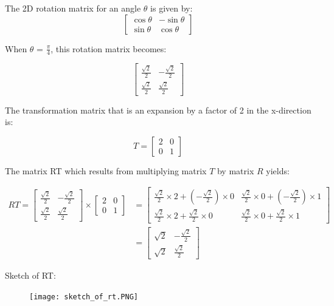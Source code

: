 \documentclass{article}
\begin{document}
The 2D rotation matrix for an angle $\theta$ is given by:
\[
\begin{bmatrix}
\cos \theta & -\sin \theta \\
\sin \theta & \cos \theta
\end{bmatrix}
\]

When $\theta$ = $\frac{\pi}{4}$, this rotation matrix becomes:

\[
\begin{bmatrix}
\frac{\sqrt{2}}{2} & -\frac{\sqrt{2}}{2} \\
\frac{\sqrt{2}}{2} & \frac{\sqrt{2}}{2}
\end{bmatrix}
\] 

The transformation matrix that is an expansion by a factor of 2 in the x-direction is:

\[T = 
\begin{bmatrix}
2 & 0 \\
0 & 1
\end{bmatrix}
\] 

The matrix RT which results from multiplying matrix $T$ by matrix $R$ yields:

\begin{align*}
RT=\begin{bmatrix}
\frac{\sqrt{2}}{2} & -\frac{\sqrt{2}}{2} \\
\frac{\sqrt{2}}{2} & \frac{\sqrt{2}}{2}
\end{bmatrix}
\times
\begin{bmatrix}
2 & 0 \\
0 & 1
\end{bmatrix}
&=
\begin{bmatrix}
\frac{\sqrt{2}}{2} \times 2 + (-\frac{\sqrt{2}}{2}) \times 0 & \frac{\sqrt{2}}{2} \times 0 + (-\frac{\sqrt{2}}{2}) \times 1 \\
\frac{\sqrt{2}}{2} \times 2 + \frac{\sqrt{2}}{2} \times 0 & \frac{\sqrt{2}}{2} \times 0 + \frac{\sqrt{2}}{2} \times 1
\end{bmatrix} \\
&=
\begin{bmatrix}
\sqrt{2} & -\frac{\sqrt{2}}{2} \\
\sqrt{2} & \frac{\sqrt{2}}{2}
\end{bmatrix}
\end{align*}

Sketch of RT:

\begin{figure}[H]
  \centering
  \texttt{[image: sketch\_of\_rt.PNG]}
  \label{fig3}
\end{figure}
\end{document}
